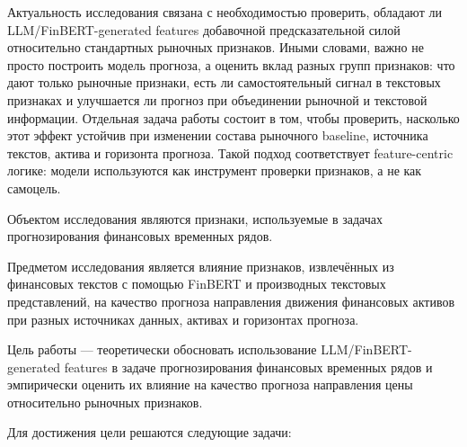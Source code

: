 Актуальность исследования связана с необходимостью проверить, обладают ли LLM/FinBERT-generated features добавочной предсказательной силой относительно стандартных рыночных признаков. Иными словами, важно не просто построить модель прогноза, а оценить вклад разных групп признаков: что дают только рыночные признаки, есть ли самостоятельный сигнал в текстовых признаках и улучшается ли прогноз при объединении рыночной и текстовой информации. Отдельная задача работы состоит в том, чтобы проверить, насколько этот эффект устойчив при изменении состава рыночного baseline, источника текстов, актива и горизонта прогноза. Такой подход соответствует feature-centric логике: модели используются как инструмент проверки признаков, а не как самоцель.

Объектом исследования являются признаки, используемые в задачах прогнозирования финансовых временных рядов.

Предметом исследования является влияние признаков, извлечённых из финансовых текстов с помощью FinBERT и производных текстовых представлений, на качество прогноза направления движения финансовых активов при разных источниках данных, активах и горизонтах прогноза.

Цель работы --- теоретически обосновать использование LLM/FinBERT-generated features в задаче прогнозирования финансовых временных рядов и эмпирически оценить их влияние на качество прогноза направления цены относительно рыночных признаков.

Для достижения цели решаются следующие задачи:

